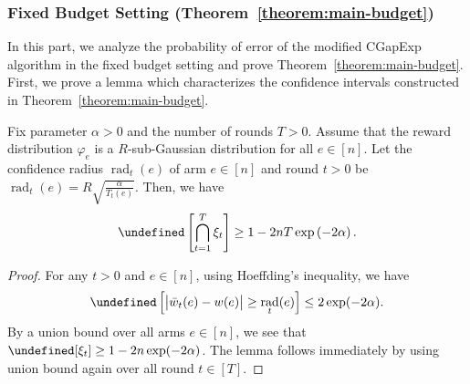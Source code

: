 \documentclass{article}
\newcommand{\Algorithm}{{\small \textsf{CGapExp}}\xspace}
\newcommand{\Rew}{\varphi}
\DeclareMathOperator{\rad}{rad}
\let\Pr\undefined
\DeclareMathOperator{\Pr}{Pr}
\begin{document}
\subsubsection{Fixed Budget Setting (Theorem~\ref{theorem:main-budget})}
In this part, we analyze the probability of error of the modified \Algorithm algorithm in the fixed budget setting and prove Theorem~\ref{theorem:main-budget}. 
First, we prove a lemma which characterizes the confidence intervals constructed in Theorem~\ref{theorem:main-budget}.
\begin{lemma}
Fix parameter $\alpha > 0$ and the number of rounds $T > 0$.
Assume that the reward distribution $\Rew_e$ is a $R$-sub-Gaussian distribution for all $e\in [n]$.
Let the confidence radius $\rad_t(e)$ of arm $e\in[n]$ and round $t>0$ be 
$\rad_t(e)=R\sqrt{\frac{\alpha}{T_t(e)}}.$
Then, we have
$$
\Pr\left[\bigcap_{t=1}^T \xi_t \right] \ge 1-2nT\exp\left(-2\alpha\right).
$$
\label{lemma:ci-budget}
\end{lemma}
\begin{proof}
For any $t>0$ and $e\in[n]$, using Hoeffding's inequality, we have
$$
\Pr\left[ \big|\bar w_t(e)-w(e) \big| \ge \rad_t(e) \right] \le 2\exp(-2\alpha).
$$
By a union bound over all arms $e\in[n]$, we see that $\Pr[\xi_t] \ge 1-2n\exp(-2\alpha)$. 
The lemma follows immediately by using union bound again over all round $t\in [T]$.
\end{proof}
\end{document}
